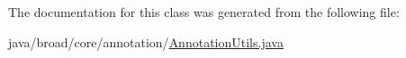 The documentation for this class was generated from the following file\+:\begin{DoxyCompactItemize}
\item 
java/broad/core/annotation/\hyperlink{broad_2core_2annotation_2_annotation_utils_8java}{Annotation\+Utils.\+java}\end{DoxyCompactItemize}
